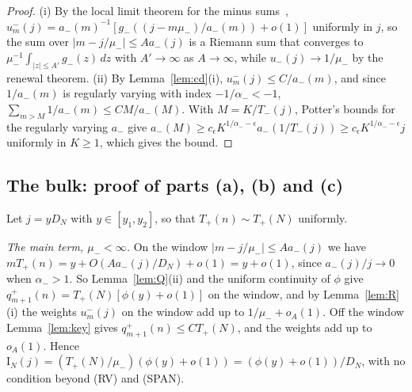 \begin{proof}
(i) By the local limit theorem for the minus sums~\cite[Lemma~A.1]{paperF},
$u^\minus_m(j)=a_\minus(m)^{-1}[g_\minus((j-m\mu_\minus)/a_\minus(m))+o(1)]$ uniformly in $j$, so the
sum over $|m-j/\mu_\minus|\le Aa_\minus(j)$ is a Riemann sum that converges to
$\mu_\minus^{-1}\int_{|z|\le A'}g_\minus(z)\,dz$ with $A'\to\infty$ as $A\to\infty$, while $u_\minus(j)\to1/\mu_\minus$ by the renewal
theorem. (ii) By Lemma~\ref{lem:cd}(i), $u^\minus_m(j)\le C/a_\minus(m)$, and since $1/a_\minus(m)$ is
regularly varying with index $-1/\alpha_\minus<-1$, $\sum_{m>M}1/a_\minus(m)\le CM/a_\minus(M)$. With
$M=K/T_\minus(j)$, Potter's bounds for the regularly varying $a_\minus$ give
$a_\minus(M)\ge c_\epsilon K^{1/\alpha_\minus-\epsilon}a_\minus(1/T_\minus(j))\ge c_\epsilon K^{1/\alpha_\minus-\epsilon}j$
uniformly in $K\ge1$, which gives the bound.
\end{proof}

\subsection{The bulk: proof of parts (a), (b) and (c)}\label{sec:dom-bulk}

Let $j=yD_N$ with $y\in[y_1,y_2]$, so that $T_\plus(n)\sim T_\plus(N)$ uniformly.

\emph{The main term, $\mu_\minus<\infty$.} On the window $|m-j/\mu_\minus|\le Aa_\minus(j)$ we have
$mT_\plus(n)=y+O(Aa_\minus(j)/D_N)+o(1)=y+o(1)$, since $a_\minus(j)/j\to0$ when $\alpha_\minus>1$. So
Lemma~\ref{lem:Q}(ii) and the uniform continuity of $\phi$ give
$q^\plus_{m+1}(n)=T_\plus(N)[\phi(y)+o(1)]$ on the window, and by Lemma~\ref{lem:R}(i) the weights
$u^\minus_m(j)$ on the window add up to $1/\mu_\minus+o_A(1)$. Off the window
Lemma~\ref{lem:key} gives $q^\plus_{m+1}(n)\le CT_\plus(N)$, and the weights add up to $o_A(1)$.
Hence $\mathrm I_N(j)=(T_\plus(N)/\mu_\minus)(\phi(y)+o(1))=(\phi(y)+o(1))/D_N$, with no condition
beyond (RV) and (SPAN).

